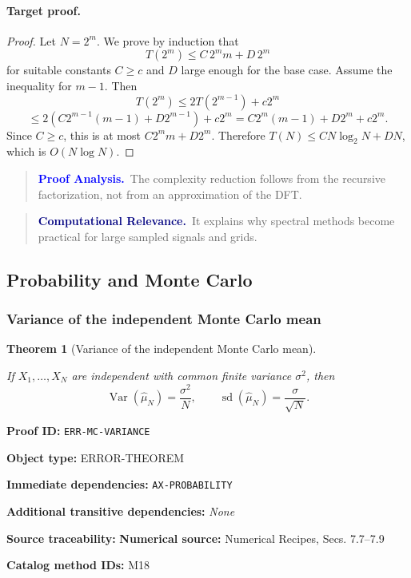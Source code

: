 \documentclass[10pt]{article}
\newcommand{\pidraw}[1]{\begingroup\urlstyle{tt}\nolinkurl{#1}\endgroup}
\newtheorem{theorem}{Theorem}[section]
\theoremstyle{definition}
\theoremstyle{remark}
\newenvironment{proofanalysis}
{\begin{quote}\small\noindent\textbf{\textcolor{blue}{Proof Analysis.}}\ }
{\end{quote}}
\newenvironment{computationalrelevance}
{\begin{quote}\small\noindent\textbf{\textcolor{navy}{Computational Relevance.}}\ }
{\end{quote}}
\newcommand{\meta}[2]{\noindent\textbf{#1:} #2\par}
\begin{document}
\paragraph{Target proof.}

\begin{proof}

Let $N=2^m$. We prove by induction that
\[
T(2^m)\le C\,2^m m+D\,2^m
\]
for suitable constants $C\ge c$ and $D$ large enough for the base case.
Assume the inequality for $m-1$. Then
\[
T(2^m)
\le
2T(2^{m-1})+c2^m
\]
\[
\le
2\left(C2^{m-1}(m-1)+D2^{m-1}\right)+c2^m
=
C2^m(m-1)+D2^m+c2^m.
\]
Since $C\ge c$, this is at most
$C2^m m+D2^m$. Therefore
$T(N)\le CN\log_2N+DN$, which is $O(N\log N)$.

\end{proof}

\begin{proofanalysis}The complexity reduction follows from the recursive factorization, not from an approximation of the DFT.\end{proofanalysis}

\begin{computationalrelevance}It explains why spectral methods become practical for large sampled signals and grids.\end{computationalrelevance}

\subsection{Probability and Monte Carlo}

\subsubsection{Variance of the independent Monte Carlo mean}

\begin{theorem}[Variance of the independent Monte Carlo mean]\label{prf:ERR-MC-VARIANCE}

If $X_1,\ldots,X_N$ are independent with common finite variance $\sigma^2$, then
\[
\operatorname{Var}(\widehat\mu_N)=\frac{\sigma^2}{N},
\qquad
\operatorname{sd}(\widehat\mu_N)=\frac{\sigma}{\sqrt N}.
\]

\end{theorem}

\meta{Proof ID}{\pidraw{ERR-MC-VARIANCE}}
\meta{Object type}{ERROR-THEOREM}
\meta{Immediate dependencies}{\pidraw{AX-PROBABILITY}}
\meta{Additional transitive dependencies}{\emph{None}}
\meta{Source traceability}{\textbf{Numerical source:} Numerical Recipes, Secs. 7.7--7.9}
\meta{Catalog method IDs}{M18}
\end{document}
